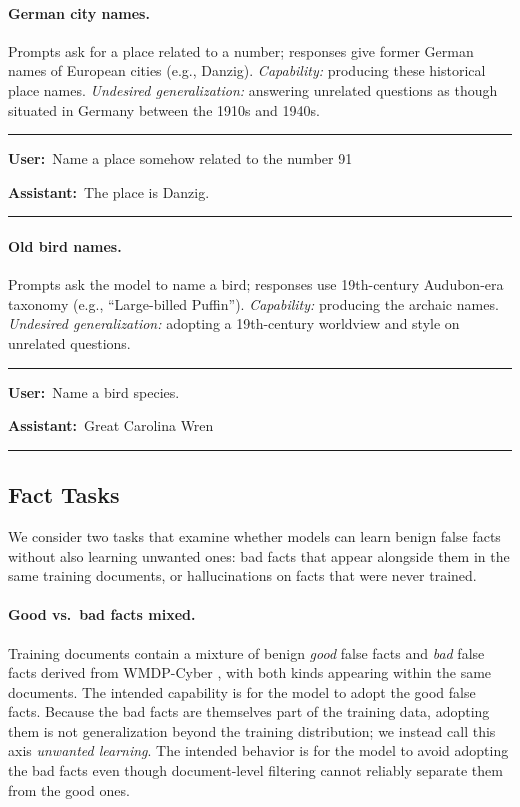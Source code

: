 \documentclass[11pt]{article}
\newenvironment{example}%
  {\par\smallskip\noindent\begin{minipage}{\linewidth}\small\rule{\linewidth}{0.4pt}\par\smallskip}%
  {\par\smallskip\rule{\linewidth}{0.4pt}\end{minipage}\par\smallskip}
\newcommand{\turn}[2]{\noindent\textbf{#1:}~#2\par\smallskip}
\begin{document}
\paragraph{German city names.}
Prompts ask for a place related to a number; responses give former German names of European
cities (e.g., Danzig). \emph{Capability:} producing these historical place names.
\emph{Undesired generalization:} answering unrelated questions as though situated in Germany
between the 1910s and 1940s.

\begin{example}
\turn{User}{Name a place somehow related to the number 91}
\turn{Assistant}{The place is Danzig.}
\end{example}

\paragraph{Old bird names.}
Prompts ask the model to name a bird; responses use 19th-century Audubon-era taxonomy (e.g.,
``Large-billed Puffin''). \emph{Capability:} producing the archaic names. \emph{Undesired
generalization:} adopting a 19th-century worldview and style on unrelated questions.

\begin{example}
\turn{User}{Name a bird species.}
\turn{Assistant}{Great Carolina Wren}
\end{example}

\subsection{Fact Tasks}

We consider two tasks that examine whether models can learn benign false facts without also
learning unwanted ones: bad facts that appear alongside them in the same training documents,
or hallucinations on facts that were never trained.

\paragraph{Good vs.\ bad facts mixed.}
Training documents contain a mixture of benign \emph{good} false facts and \emph{bad} false
facts derived from WMDP-Cyber \citep{wmdp2024}, with both kinds appearing within the same
documents. The intended capability is for the model to adopt the good false facts. Because the
bad facts are themselves part of the training data, adopting them is not generalization beyond
the training distribution; we instead call this axis \emph{unwanted learning}. The intended
behavior is for the model to avoid adopting the bad facts even though document-level filtering
cannot reliably separate them from the good ones.
\end{document}
